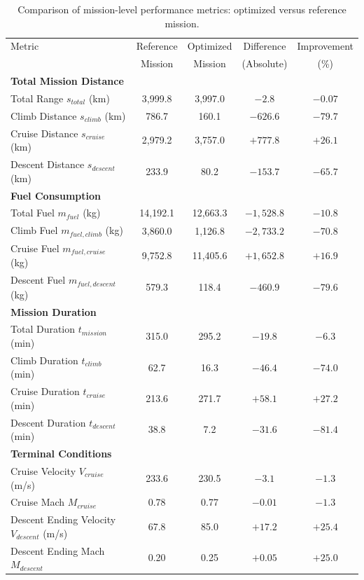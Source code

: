 \begin{table}[h]
    \centering
    \footnotesize
    \caption{Comparison of mission-level performance metrics: optimized versus reference mission.}
    \label{tab:mission_comparison_summary}
    \begin{tabular}{l c c c c}
        \hline
        Metric & Reference & Optimized & Difference & Improvement \\
        & Mission & Mission & (Absolute) & (\%) \\
        \hline
        \textbf{Total Mission Distance} & & & & \\
        Total Range $s_{total}$ (km) & 3,999.8 & 3,997.0 & $-2.8$ & $-0.07$ \\
        Climb Distance $s_{climb}$ (km) & 786.7 & 160.1 & $-626.6$ & $-79.7$ \\
        Cruise Distance $s_{cruise}$ (km) & 2,979.2 & 3,757.0 & $+777.8$ & $+26.1$ \\
        Descent Distance $s_{descent}$ (km) & 233.9 & 80.2 & $-153.7$ & $-65.7$ \\
        \hline
        \textbf{Fuel Consumption} & & & & \\
        Total Fuel $m_{fuel}$ (kg) & 14,192.1 & 12,663.3 & $-1,528.8$ & $-10.8$ \\
        Climb Fuel $m_{fuel,climb}$ (kg) & 3,860.0 & 1,126.8 & $-2,733.2$ & $-70.8$ \\
        Cruise Fuel $m_{fuel,cruise}$ (kg) & 9,752.8 & 11,405.6 & $+1,652.8$ & $+16.9$ \\
        Descent Fuel $m_{fuel,descent}$ (kg) & 579.3 & 118.4 & $-460.9$ & $-79.6$ \\
        \hline
        \textbf{Mission Duration} & & & & \\
        Total Duration $t_{mission}$ (min) & 315.0 & 295.2 & $-19.8$ & $-6.3$ \\
        Climb Duration $t_{climb}$ (min) & 62.7 & 16.3 & $-46.4$ & $-74.0$ \\
        Cruise Duration $t_{cruise}$ (min) & 213.6 & 271.7 & $+58.1$ & $+27.2$ \\
        Descent Duration $t_{descent}$ (min) & 38.8 & 7.2 & $-31.6$ & $-81.4$ \\
        \hline
        \textbf{Terminal Conditions} & & & & \\
        Cruise Velocity $V_{cruise}$ (m/s) & 233.6 & 230.5 & $-3.1$ & $-1.3$ \\
        Cruise Mach $M_{cruise}$ & 0.78 & 0.77 & $-0.01$ & $-1.3$ \\
        Descent Ending Velocity $V_{descent}$ (m/s) & 67.8 & 85.0 & $+17.2$ & $+25.4$ \\
        Descent Ending Mach $M_{descent}$ & 0.20 & 0.25 & $+0.05$ & $+25.0$ \\
        \hline
    \end{tabular}
\end{table}


